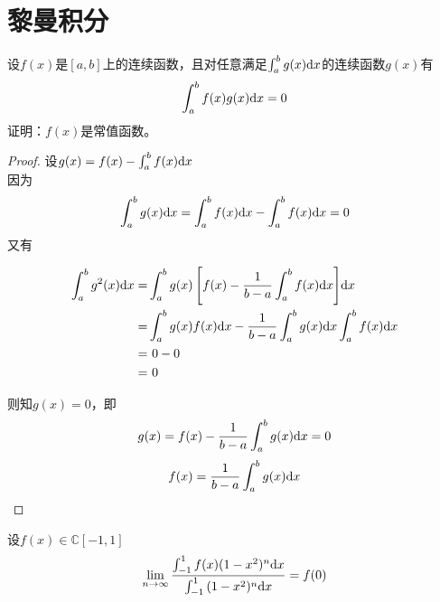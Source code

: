 \section{黎曼积分}

\begin{proposition}
    
    设$f(x)$是$[a,b]$上的连续函数，且对任意满足$\int_{a}^{b}{g(x)}\mathrm{d} x$的连续函数$g(x)$有
    $$\int_{a}^{b}{f(x)g(x)}\mathrm{d} x = 0$$
    证明：$f(x)$是常值函数。

\end{proposition}

\begin{proof}

    设$g(x) = f(x) - \int_{a}^{b}{f(x)}\mathrm{d} x$\\
    因为
    $$\int_{a}^{b}{g(x)}\mathrm{d} x = \int_{a}^{b}{f(x)}\mathrm{d} x - \int_{a}^{b}{f(x)}\mathrm{d} x = 0$$
    又有
    
    \begin{align*}
        \int_{a}^{b}{g^2(x)}\mathrm{d} x = & \int_{a}^{b}{g(x)\left[ f(x) - \dfrac{1}{b-a} \int_{a}^{b}{f(x)}\mathrm{d} x \right]}\mathrm{d} x \\
        = & \int_{a}^{b}{g(x)f(x)}\mathrm{d} x - \dfrac{1}{b-a} \int_{a}^{b}{g(x)}\mathrm{d} x \int_{a}^{b}{f(x)}\mathrm{d} x \\
        = & \ 0 - 0 \\
        = & \  0
    \end{align*}
    
    则知$g(x) = 0$，即
    $$g(x) = f(x) - \dfrac{1}{b-a} \int_{a}^{b}{g(x)}\mathrm{d} x = 0$$
    $$f(x) = \dfrac{1}{b-a} \int_{a}^{b}{g(x)}\mathrm{d} x $$

\end{proof}

\begin{proposition}

    设$f(x) \in \mathbb{C}[-1,1]$
    $$\lim\limits_{n\to\infty}{\dfrac{\int_{-1}^{1}{f(x)(1 - x^2)^n}\mathrm{d} x}{\int_{-1}^{1}{(1 - x^2)^n}\mathrm{d} x}} = f(0)$$

\end{proposition}

